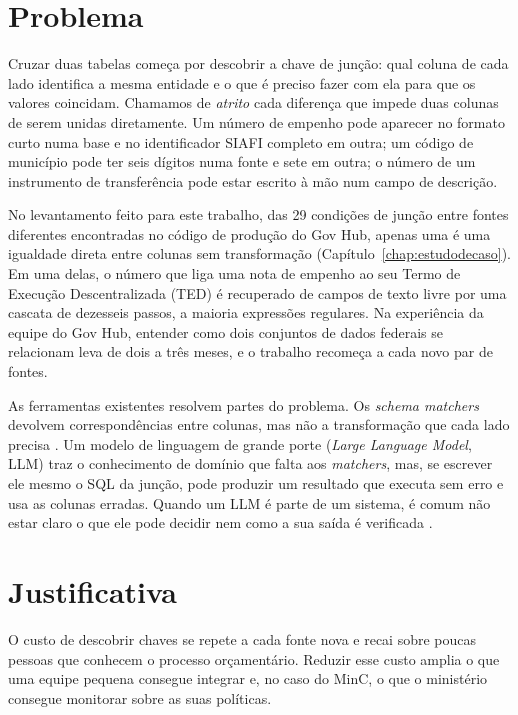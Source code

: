 \section{Problema}
\label{sec:introducao-problema}

Cruzar duas tabelas começa por descobrir a chave de junção: qual coluna de
cada lado identifica a mesma entidade e o que é preciso fazer com ela para
que os valores coincidam. Chamamos de \emph{atrito} cada diferença que impede
duas colunas de serem unidas diretamente. Um número de empenho pode aparecer
no formato curto numa base e no identificador SIAFI completo em outra; um
código de município pode ter seis dígitos numa fonte e sete em outra; o
número de um instrumento de transferência pode estar escrito à mão num campo
de descrição.

No levantamento feito para este trabalho, das 29 condições de junção entre
fontes diferentes encontradas no código de produção do Gov Hub, apenas uma é
uma igualdade direta entre colunas sem transformação
(Capítulo~\ref{chap:estudodecaso}). Em uma delas, o número que liga uma nota
de empenho ao seu Termo de Execução Descentralizada (TED) é recuperado de
campos de texto livre por uma cascata de dezesseis passos, a maioria
expressões regulares. Na experiência da equipe do Gov Hub, entender como dois
conjuntos de dados federais se relacionam leva de dois a três meses, e o
trabalho recomeça a cada novo par de fontes.

As ferramentas existentes resolvem partes do problema. Os \emph{schema
matchers} devolvem correspondências entre colunas, mas não a transformação
que cada lado precisa \cite{rahm2001survey,koutras2021valentine}. Um modelo
de linguagem de grande porte (\emph{Large Language Model}, LLM) traz o
conhecimento de domínio que falta aos \emph{matchers}, mas, se escrever ele
mesmo o SQL da junção, pode produzir um resultado que executa sem erro e usa
as colunas erradas. Quando um LLM é parte de um sistema, é comum não estar
claro o que ele pode decidir nem como a sua saída é verificada
\cite{shao2025integration}.

\section{Justificativa}
\label{sec:introducao-justificativa}

O custo de descobrir chaves se repete a cada fonte nova e recai sobre poucas
pessoas que conhecem o processo orçamentário. Reduzir esse custo amplia o que
uma equipe pequena consegue integrar e, no caso do MinC, o que o ministério
consegue monitorar sobre as suas políticas.

